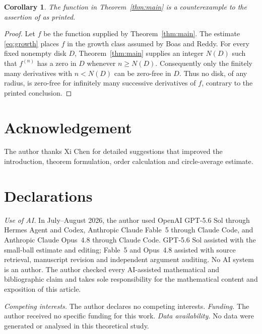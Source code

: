 \documentclass[plain]{baustms}
\theoremstyle{cupthm}
\newtheorem{corollary}[theorem]{Corollary}
\begin{document}
\begin{corollary}
The function in Theorem~\ref{thm:main} is a counterexample to the assertion of
\cite[Theorem~1]{BoasReddy1973} as printed.
\end{corollary}

\begin{proof}
Let $f$ be the function supplied by Theorem~\ref{thm:main}. The estimate
\eqref{eq:growth} places $f$ in the growth class assumed by Boas and Reddy.
For every fixed nonempty disk $D$, Theorem~\ref{thm:main} supplies an integer
$N(D)$ such that $f^{(n)}$ has a zero in $D$ whenever $n\geq N(D)$.
Consequently only the finitely many derivatives with $n<N(D)$ can be
zero-free in $D$. Thus no disk, of any radius, is zero-free for infinitely
many successive derivatives of $f$, contrary to the printed conclusion.
\end{proof}

\section*{Acknowledgement}
The author thanks Xi Chen for detailed suggestions that improved the
introduction, theorem formulation, order calculation and circle-average
estimate.

\section*{Declarations}
\noindent\textit{Use of AI.} In July--August 2026, the author used OpenAI
GPT-5.6 Sol through Hermes Agent and Codex, Anthropic Claude Fable~5 through
Claude Code, and Anthropic Claude Opus~4.8 through Claude Code. GPT-5.6 Sol
assisted with the small-ball estimate and editing; Fable~5 and Opus~4.8
assisted with source retrieval, manuscript revision and independent argument
auditing. No AI system is an author. The author checked every AI-assisted
mathematical and bibliographic claim and takes sole responsibility for the
mathematical content and exposition of this article.

\noindent\textit{Competing interests.} The author declares no competing
interests. \textit{Funding.} The author received no specific funding for this
work. \textit{Data availability.} No data were generated or analysed in this
theoretical study.
\end{document}
